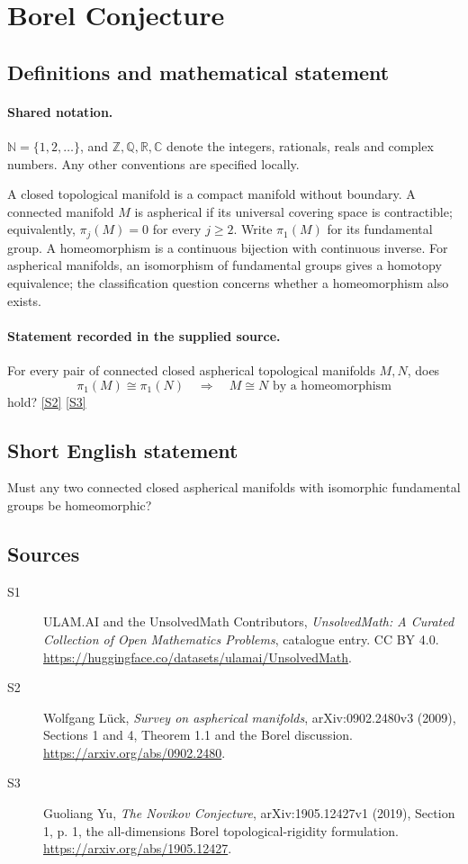 \documentclass[11pt]{article}
\newcommand{\sref}[2]{\hyperlink{source:#1:#2}{[S#2]}}
\begin{document}
\section{Borel Conjecture}\label{statement}

\subsection{Definitions and mathematical statement}

\paragraph{Shared notation.}$\mathbb N=\{1,2,\ldots\}$, and $\mathbb Z,\mathbb Q,\mathbb R,\mathbb C$ denote the integers, rationals, reals and complex numbers. Any other conventions are specified locally.


A closed topological manifold is a compact manifold without boundary.
A connected manifold \(M\) is aspherical if its universal covering space is
contractible; equivalently, \(\pi_j(M)=0\) for every \(j\ge2\).
Write \(\pi_1(M)\) for its fundamental group. A homeomorphism is a
continuous bijection with continuous inverse. For aspherical manifolds,
an isomorphism of fundamental groups gives a homotopy equivalence;
the classification question concerns whether a homeomorphism also exists.
\paragraph{Statement recorded in the supplied source.}
For every pair of connected closed aspherical topological manifolds
\(M,N\), does
\[
 \pi_1(M)\cong\pi_1(N)\quad\Longrightarrow\quad M\cong N
             \text{ by a homeomorphism}
\]
hold? \sref{statement}{2} \sref{statement}{3}
\subsection{Short English statement}
Must any two connected closed aspherical manifolds with isomorphic fundamental groups be homeomorphic?
\subsection{Sources}
\begin{description}
\item[\hypertarget{source:statement:1}{S1}] ULAM.AI and the UnsolvedMath Contributors, \emph{UnsolvedMath: A Curated Collection of Open Mathematics Problems}, catalogue entry. CC BY 4.0. \url{https://huggingface.co/datasets/ulamai/UnsolvedMath}.
\item[\hypertarget{source:statement:2}{S2}] Wolfgang L\"uck, \emph{Survey on aspherical manifolds}, arXiv:0902.2480v3 (2009), Sections 1 and 4, Theorem 1.1 and the Borel discussion. \url{https://arxiv.org/abs/0902.2480}.
\item[\hypertarget{source:statement:3}{S3}] Guoliang Yu, \emph{The Novikov Conjecture}, arXiv:1905.12427v1 (2019), Section 1, p. 1, the all-dimensions Borel topological-rigidity formulation. \url{https://arxiv.org/abs/1905.12427}.
\end{description}
\label{end:statement}
\end{document}
